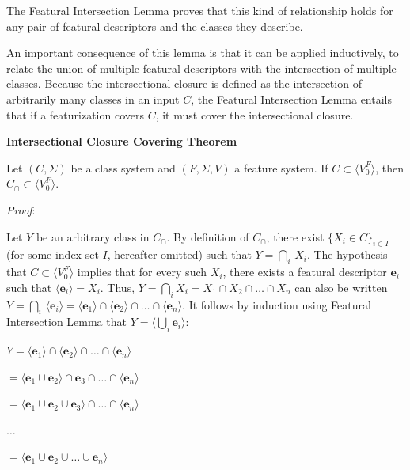\documentclass[12pt, oneside]{article}   	%
\newenvironment{clump}
{
	\edef\myindent{\the\parindent}
	\noindent\begin{minipage}{\textwidth}
	\setlength\parindent{\myindent}\fussy
}
{
	\end{minipage}
}
\begin{document}
\noindent The Featural Intersection Lemma proves that this kind of relationship holds for any pair of featural descriptors and the classes they describe.

An important consequence of this lemma is that it can be applied inductively, to relate the union of multiple featural descriptors with the intersection of multiple classes. Because the intersectional closure is defined as the intersection of arbitrarily many classes in an input $C$, the Featural Intersection Lemma entails that if a featurization covers $C$, it must cover the intersectional closure.

\begin{clump}
\vspace{\baselineskip} \noindent \textbf{Intersectional Closure Covering Theorem}

\noindent Let $(C, \Sigma)$ be a class system and $(F, \Sigma, V)$ a feature system. If $C \subset \langle V_0^F \rangle$, then $C_\cap \subset\langle V_0^F \rangle $.
\end{clump}

\noindent \textit{Proof}:

Let $Y$ be an arbitrary class in $C_\cap$. By definition of $C_\cap$, there exist $\{X_i \in C\}_{i \in I}$ (for some index set $I$, hereafter omitted) such that $Y = \bigcap_i \, X_i$. The hypothesis that $C \subset \langle V_0^F \rangle $ implies that for every such $X_i$, there exists a featural descriptor $\mathbf{e}_i$ such that $\langle \mathbf{e}_i \rangle = X_i$. Thus, $Y = \bigcap_i X_i = X_1 \cap X_2 \cap \ldots \cap X_n$ can also be written $Y = \bigcap_i \, \langle \mathbf{e}_i \rangle = \langle \mathbf{e}_1 \rangle \cap \langle \mathbf{e}_2 \rangle \cap \ldots \cap \langle \mathbf{e}_n \rangle$. It follows by induction using Featural Intersection Lemma that $Y = \langle \bigcup_i \mathbf{e}_i \rangle$:

$Y = \langle \mathbf{e}_1 \rangle \cap  \langle \mathbf{e}_2 \rangle \cap \ldots \cap  \langle \mathbf{e}_n \rangle$

\quad $ = \langle \mathbf{e}_1 \cup \mathbf{e}_2 \rangle \cap \mathbf{e}_3 \cap \ldots \cap \langle \mathbf{e}_n \rangle$

\quad $ = \langle \mathbf{e}_1 \cup \mathbf{e}_2 \cup \mathbf{e}_3 \rangle \cap \ldots \cap \langle \mathbf{e}_n \rangle$

\quad $\ldots$

\quad $= \langle \mathbf{e}_1 \cup \mathbf{e}_2 \cup \ldots \cup \mathbf{e}_n \rangle$
\end{document}
